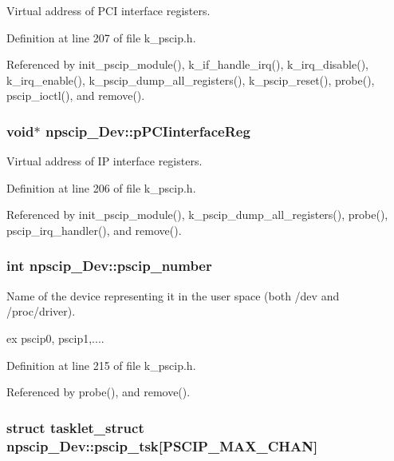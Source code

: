 Virtual address of PCI interface registers. 



Definition at line 207 of file k\_\-pscip.h.

Referenced by init\_\-pscip\_\-module(), k\_\-if\_\-handle\_\-irq(), k\_\-irq\_\-disable(), k\_\-irq\_\-enable(), k\_\-pscip\_\-dump\_\-all\_\-registers(), k\_\-pscip\_\-reset(), probe(), pscip\_\-ioctl(), and remove().\hypertarget{structnpscip___dev_dbe8eac260892a669589f3ca732c4ad7}{
\subsubsection[{pPCIinterfaceReg}]{\setlength{\rightskip}{0pt plus 5cm}void$\ast$ {\bf npscip\_\-Dev::pPCIinterfaceReg}}}
\label{structnpscip___dev_dbe8eac260892a669589f3ca732c4ad7}


Virtual address of IP interface registers. 



Definition at line 206 of file k\_\-pscip.h.

Referenced by init\_\-pscip\_\-module(), k\_\-pscip\_\-dump\_\-all\_\-registers(), probe(), pscip\_\-irq\_\-handler(), and remove().\hypertarget{structnpscip___dev_d340ce8452c6d05d1c1d8755ca9d6715}{
\subsubsection[{pscip\_\-number}]{\setlength{\rightskip}{0pt plus 5cm}int {\bf npscip\_\-Dev::pscip\_\-number}}}
\label{structnpscip___dev_d340ce8452c6d05d1c1d8755ca9d6715}


Name of the device representing it in the user space (both /dev and /proc/driver). 

ex pscip0, pscip1,.... 

Definition at line 215 of file k\_\-pscip.h.

Referenced by probe(), and remove().\hypertarget{structnpscip___dev_136ae19fbe301b0bfcf3d143e59e7bed}{
\subsubsection[{pscip\_\-tsk}]{\setlength{\rightskip}{0pt plus 5cm}struct tasklet\_\-struct {\bf npscip\_\-Dev::pscip\_\-tsk}\mbox{[}PSCIP\_\-MAX\_\-CHAN\mbox{]}}}
\label{structnpscip___dev_136ae19fbe301b0bfcf3d143e59e7bed}


